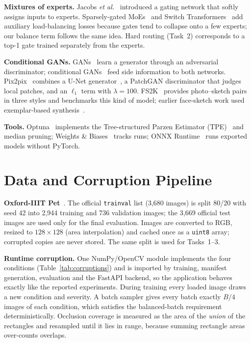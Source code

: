 \documentclass[conference]{IEEEtran}
\begin{document}
\textbf{Mixtures of experts.} Jacobs \emph{et al.}~\cite{jacobs1991} introduced a gating network that softly assigns
inputs to experts. Sparsely-gated MoEs~\cite{shazeer2017} and Switch Transformers~\cite{fedus2022} add auxiliary
load-balancing losses because gates tend to collapse onto a few experts; our balance term follows the same idea.
Hard routing (Task~2) corresponds to a top-1 gate trained separately from the experts.

\textbf{Conditional GANs.} GANs~\cite{goodfellow2014} learn a generator through an adversarial discriminator;
conditional GANs~\cite{mirza2014} feed side information to both networks. Pix2pix~\cite{isola2017} combines a U-Net
generator~\cite{ronneberger2015}, a PatchGAN discriminator that judges local patches, and an $\ell_1$ term with
$\lambda=100$. FS2K~\cite{fan2022} provides photo--sketch pairs in three styles and benchmarks this kind of model;
earlier face-sketch work used exemplar-based synthesis~\cite{wang2009}.

\textbf{Tools.} Optuna~\cite{akiba2019} implements the Tree-structured Parzen Estimator (TPE)~\cite{bergstra2011}
and median pruning; Weights \& Biases~\cite{wandb} tracks runs; ONNX Runtime~\cite{onnxruntime} runs exported models
without PyTorch.

\section{Data and Corruption Pipeline}\label{sec:data}
\textbf{Oxford-IIIT Pet}~\cite{parkhi2012}. The official \texttt{trainval} list (3,680 images) is split 80/20 with
seed 42 into 2,944 training and 736 validation images; the 3,669 official test images are used only for the final
evaluation. Images are converted to RGB, resized to $128\times128$ (area interpolation) and cached once as a
\texttt{uint8} array; corrupted copies are never stored. The same split is used for Tasks~1--3.

\textbf{Runtime corruption.} One NumPy/OpenCV module implements the four conditions
(Table~\ref{tab:corruptions}) and is imported by training, manifest generation, evaluation and the FastAPI backend,
so the application behaves exactly like the reported experiments. During training every loaded image draws a new
condition and severity. A batch sampler gives every batch exactly $B/4$ images of each condition, which satisfies
the balanced-batch requirement deterministically. Occlusion coverage is measured as the area of the
\emph{union} of the rectangles and resampled until it lies in range, because summing rectangle areas over-counts
overlaps.
\end{document}
